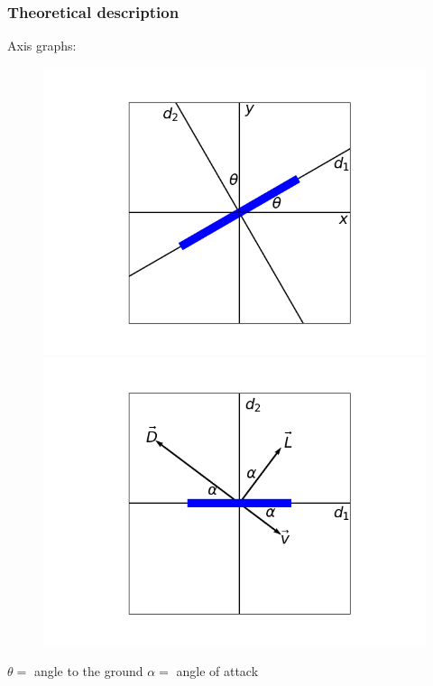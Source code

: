 \documentclass{beamer}
\begin{document}
\begin{frame}

\frametitle{Theoretical description}

\begin{Large}
Axis graphs:
\end{Large}

\begin{figure}[H]
	\centering
	\begin{minipage}{.5\textwidth}
	  \centering
	  \includegraphics[width=\textwidth]{graf_osi.png}
	\end{minipage}%
	\begin{minipage}{.5\textwidth}
	  \centering
	  \includegraphics[width=\textwidth]{osi_frisbeeja.png}
	\end{minipage}
\end{figure}

$ \theta = $ angle to the ground \qquad \qquad $ \alpha = $ angle of attack

\end{frame}
\end{document}
